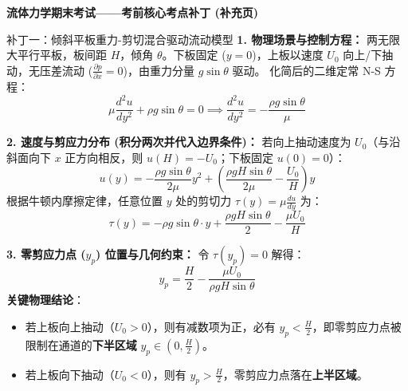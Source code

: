 \documentclass[11pt,a4paper]{article}
\begin{document}
\begin{center}
    \textbf{\LARGE 流体力学期末考试——考前核心考点补丁 (补充页)}
\end{center}
\vspace{-0.4cm}

\begin{patchbox}{补丁一：倾斜平板重力-剪切混合驱动流动模型}
\textbf{1. 物理场景与控制方程：}
两无限大平行平板，板间距 $H$，倾角 $\theta$。下板固定 ($y=0$)，上板以速度 $U_0$ 向上/下抽动，无压差流动 ($\frac{\partial p}{\partial x} = 0$)，由重力分量 $g\sin\theta$ 驱动。
化简后的二维定常 N-S 方程：
\begin{equation}
    \mu \frac{d^2u}{dy^2} + \rho g \sin\theta = 0 \implies \frac{d^2u}{dy^2} = -\frac{\rho g \sin\theta}{\mu}
\end{equation}

\textbf{2. 速度与剪应力分布 (积分两次并代入边界条件)：}
若向上抽动速度为 $U_0$（与沿斜面向下 $x$ 正方向相反，则 $u(H) = -U_0$；下板固定 $u(0)=0$）：
\begin{equation}
    u(y) = -\frac{\rho g \sin\theta}{2\mu} y^2 + \left( \frac{\rho g H \sin\theta}{2\mu} - \frac{U_0}{H} \right) y
\end{equation}
根据牛顿内摩擦定律，任意位置 $y$ 处的剪切力 $\tau(y) = \mu \frac{du}{dy}$ 为：
\begin{equation}
    \tau(y) = -\rho g \sin\theta \cdot y + \frac{\rho g H \sin\theta}{2} - \frac{\mu U_0}{H}
\end{equation}

\textbf{3. 零剪应力点 ($y_p$) 位置与几何约束：}
令 $\tau(y_p) = 0$ 解得：
\begin{equation}
    y_p = \frac{H}{2} - \frac{\mu U_0}{\rho g H \sin\theta}
\end{equation}
\textbf{关键物理结论}：
\begin{itemize}
    \item 若上板向上抽动（$U_0 > 0$），则有减数项为正，必有 $y_p < \frac{H}{2}$，即零剪应力点被限制在通道的\textbf{下半区域} $y_p \in \left(0, \frac{H}{2}\right)$。
    \item 若上板向下抽动（$U_0 < 0$），则有 $y_p > \frac{H}{2}$，零剪应力点落在\textbf{上半区域}。
\end{itemize}
\end{patchbox}
\end{document}
